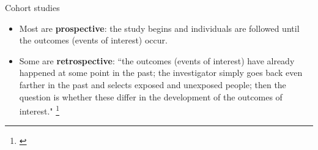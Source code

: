 \documentclass{beamer}
\begin{document}


\begin{frame}{Cohort studies}
	\begin{itemize}
	\item Most are \textbf{prospective}: the study begins and individuals are followed until the outcomes (events of interest) occur. 
	\item Some are \textbf{retrospective}: ``the outcomes (events of interest) have already happened at some point in the past; the investigator simply goes back even farther in the past and selects exposed and unexposed people; then the question is whether these differ in the development of the outcomes of interest."
	\footnote{\tiny{\citet[p. 147]{Guyatt2008d}}}
	\end{itemize}
\end{frame}
\end{document}
